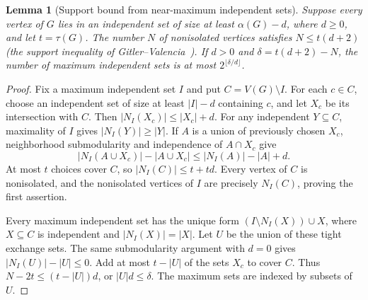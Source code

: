 \documentclass[11pt]{article}
\newtheorem{lemma}[theorem]{Lemma}
\theoremstyle{definition}
\theoremstyle{plain}
\begin{document}
\begin{lemma}[Support bound from near-maximum independent sets]\label{lem:near-support}
Suppose every vertex of $G$ lies in an independent set of size at least
$\alpha(G)-d$, where $d\ge0$, and let $t=\tau(G)$.
The number $N$ of nonisolated vertices satisfies $N\le t(d+2)$
(the support inequality of Gitler--Valencia~\cite{gitler2010}).
If $d>0$ and $\delta=t(d+2)-N$, the number of maximum independent
sets is at most $2^{\lfloor\delta/d\rfloor}$.
\end{lemma}
\begin{proof}
Fix a maximum independent set $I$ and put $C=V(G)\setminus I$.
For each $c\in C$, choose an independent set of size at least
$|I|-d$ containing $c$, and let $X_c$ be its intersection with $C$.
Then $|N_I(X_c)|\le|X_c|+d$. For any independent $Y\subseteq C$,
maximality of $I$ gives $|N_I(Y)|\ge|Y|$.
If $A$ is a union of previously chosen $X_c$, neighborhood submodularity
and independence of $A\cap X_c$ give
\[
 |N_I(A\cup X_c)|-|A\cup X_c|
 \le |N_I(A)|-|A|+d.
\]
At most $t$ choices cover $C$, so $|N_I(C)|\le t+td$.
Every vertex of $C$ is nonisolated, and the nonisolated vertices of $I$
are precisely $N_I(C)$, proving the first assertion.

Every maximum independent set has the unique form
$(I\setminus N_I(X))\cup X$, where $X\subseteq C$ is independent
and $|N_I(X)|=|X|$. Let $U$ be the union of these tight exchange sets.
The same submodularity argument with $d=0$ gives
$|N_I(U)|-|U|\le0$. Add at most $t-|U|$ of the sets $X_c$ to cover
$C$. Thus $N-2t\le(t-|U|)d$, or $|U|d\le\delta$.
The maximum sets are indexed by subsets of $U$.
\end{proof}
\end{document}
